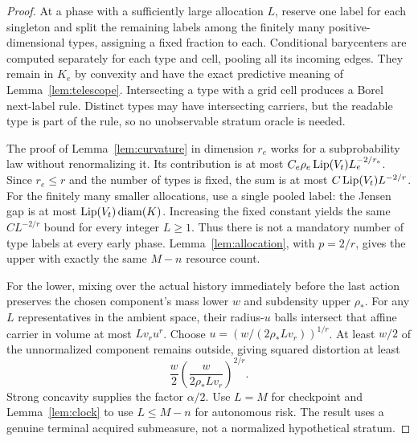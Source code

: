 \begin{proof}
At a phase with a sufficiently large allocation $L$, reserve one label for each singleton and split the remaining labels among the finitely many positive-dimensional types, assigning a fixed fraction to each. Conditional barycenters are computed separately for each type and cell, pooling all its incoming edges. They remain in $K_e$ by convexity and have the exact predictive meaning of Lemma~\ref{lem:telescope}. Intersecting a type with a grid cell produces a Borel next-label rule. Distinct types may have intersecting carriers, but the readable type is part of the rule, so no unobservable stratum oracle is needed.

The proof of Lemma~\ref{lem:curvature} in dimension $r_e$ works for a subprobability law without renormalizing it. Its contribution is at most $C_e\rho_e\operatorname{Lip}(V_t)L_e^{-2/r_e}$. Since $r_e\le r$ and the number of types is fixed, the sum is at most $C\operatorname{Lip}(V_t)L^{-2/r}$. For the finitely many smaller allocations, use a single pooled label: the Jensen gap is at most $\operatorname{Lip}(V_t)\operatorname{diam}(K)$. Increasing the fixed constant yields the same $CL^{-2/r}$ bound for every integer $L\ge1$. Thus there is not a mandatory number of type labels at every early phase. Lemma~\ref{lem:allocation}, with $p=2/r$, gives the upper with exactly the same $M-n$ resource count.

For the lower, mixing over the actual history immediately before the last action preserves the chosen component's mass lower $w$ and subdensity upper $\rho_*$. For any $L$ representatives in the ambient space, their radius-$u$ balls intersect that affine carrier in volume at most $L v_r u^r$. Choose $u=(w/(2\rho_*Lv_r))^{1/r}$. At least $w/2$ of the unnormalized component remains outside, giving squared distortion at least
\[
 \frac{w}{2}\left(\frac{w}{2\rho_*Lv_r}\right)^{2/r}.
\]
Strong concavity supplies the factor $\alpha/2$. Use $L=M$ for checkpoint and Lemma~\ref{lem:clock} to use $L\le M-n$ for autonomous risk. The result uses a genuine terminal acquired submeasure, not a normalized hypothetical stratum.
\end{proof}

